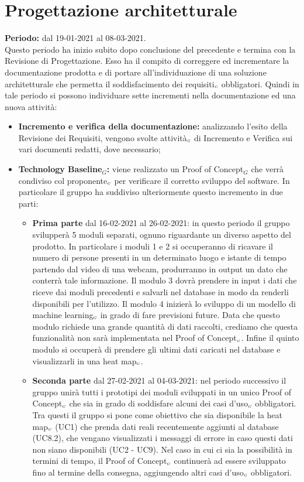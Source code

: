 \section{Progettazione architetturale}\label{PianificazioneProgettazioneArchitetturale}
\textbf{Periodo:} dal 19-01-2021 al 08-03-2021. \\
Questo periodo ha inizio subito dopo conclusione del precedente e termina con la Revisione di Progettazione.
Esso ha il compito di correggere ed incrementare la documentazione prodotta e di portare all'individuazione di una soluzione architetturale che permetta il soddisfacimento dei requisiti$_{\scaleto{G}{3pt}}$ obbligatori. Quindi in tale periodo si possono individuare sette incrementi nella documentazione ed una nuova attività:
\begin{itemize}
	\item \textbf{Incremento e verifica della documentazione:} analizzando l'esito della Revisione dei Requisiti, vengono svolte attività$_{\scaleto{G}{3pt}}$ di Incremento e Verifica sui vari documenti redatti, dove necessario;
	\item \textbf{Technology Baseline$_G$:}	viene realizzato un Proof of Concept$_G$ che verrà condiviso col proponente$_{\scaleto{G}{3pt}}$ per verificare il corretto sviluppo del software. In particolare il gruppo ha suddiviso ulteriormente questo incremento in due parti:
	\begin{itemize}
		\item \textbf{Prima parte} dal 16-02-2021 al 26-02-2021: in questo periodo il gruppo svilupperà 5 moduli separati, ognuno riguardante un diverso aspetto del prodotto. In particolare i moduli 1 e 2 si occuperanno di ricavare il numero di persone presenti in un determinato luogo e istante di tempo partendo dal video di una webcam, produrranno in output un dato che conterrà tale informazione. Il modulo 3 dovrà prendere in input i dati che riceve dai moduli precedenti e salvarli nel database in modo da renderli disponibili per l'utilizzo. Il modulo 4 inizierà lo sviluppo di un modello di machine learning$_{\scaleto{G}{3pt}}$ in grado di fare previsioni future. Data che questo modulo richiede una grande quantità di dati raccolti, crediamo che questa funzionalità non sarà implementata nel Proof of Concept$_{\scaleto{G}{3pt}}$. Infine il quinto modulo si occuperà di prendere gli ultimi dati caricati nel database e visualizzarli in una heat map$_{\scaleto{G}{3pt}}$.
		\item \textbf{Seconda parte} dal 27-02-2021 al 04-03-2021: nel periodo successivo il gruppo unirà tutti i prototipi dei moduli sviluppati in un unico Proof of Concept$_{\scaleto{G}{3pt}}$ che sia in grado di soddisfare alcuni dei casi d'uso$_{\scaleto{G}{3pt}}$ obbligatori. Tra questi il gruppo si pone come obiettivo che sia disponibile la heat map$_{\scaleto{G}{3pt}}$ (UC1) che prenda dati reali recentemente aggiunti al database (UC8.2), che vengano visualizzati i messaggi di errore in caso questi dati non siano disponibili (UC2 - UC9). Nel caso in cui ci sia la possibilità in termini di tempo, il Proof of Concept$_{\scaleto{G}{3pt}}$ continuerà ad essere sviluppato fino al termine della consegna, aggiungendo altri casi d'uso$_{\scaleto{G}{3pt}}$ obbligatori.

\end{itemize}
\end{itemize}

